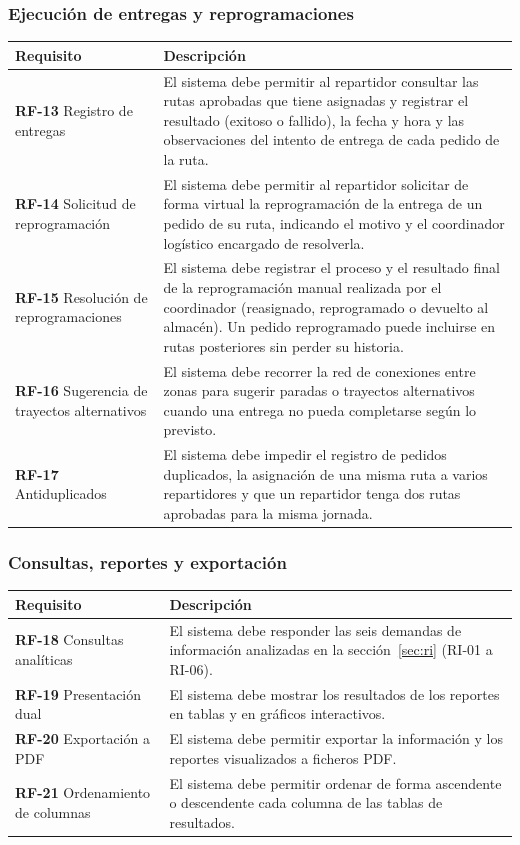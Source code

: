 \documentclass[11pt,a4paper]{article}
\begin{document}
\subsubsection{Ejecución de entregas y reprogramaciones}
\begin{longtable}{P{0.30\textwidth}P{0.64\textwidth}}
\toprule
\textbf{Requisito} & \textbf{Descripción}\\ \midrule
\endhead
\textbf{RF-13} Registro de entregas & El sistema debe permitir al repartidor consultar las rutas aprobadas que tiene asignadas y registrar el resultado (exitoso o fallido), la fecha y hora y las observaciones del intento de entrega de cada pedido de la ruta.\\
\textbf{RF-14} Solicitud de reprogramación & El sistema debe permitir al repartidor solicitar de forma virtual la reprogramación de la entrega de un pedido de su ruta, indicando el motivo y el coordinador logístico encargado de resolverla.\\
\textbf{RF-15} Resolución de reprogramaciones & El sistema debe registrar el proceso y el resultado final de la reprogramación manual realizada por el coordinador (reasignado, reprogramado o devuelto al almacén). Un pedido reprogramado puede incluirse en rutas posteriores sin perder su historia.\\
\textbf{RF-16} Sugerencia de trayectos alternativos & El sistema debe recorrer la red de conexiones entre zonas para sugerir paradas o trayectos alternativos cuando una entrega no pueda completarse según lo previsto.\\
\textbf{RF-17} Antiduplicados & El sistema debe impedir el registro de pedidos duplicados, la asignación de una misma ruta a varios repartidores y que un repartidor tenga dos rutas aprobadas para la misma jornada.\\
\bottomrule
\end{longtable}

\subsubsection{Consultas, reportes y exportación}
\begin{longtable}{P{0.30\textwidth}P{0.64\textwidth}}
\toprule
\textbf{Requisito} & \textbf{Descripción}\\ \midrule
\endhead
\textbf{RF-18} Consultas analíticas & El sistema debe responder las seis demandas de información analizadas en la sección~\ref{sec:ri} (RI-01 a RI-06).\\
\textbf{RF-19} Presentación dual & El sistema debe mostrar los resultados de los reportes en tablas y en gráficos interactivos.\\
\textbf{RF-20} Exportación a PDF & El sistema debe permitir exportar la información y los reportes visualizados a ficheros PDF.\\
\textbf{RF-21} Ordenamiento de columnas & El sistema debe permitir ordenar de forma ascendente o descendente cada columna de las tablas de resultados.\\
\bottomrule
\end{longtable}
\end{document}
